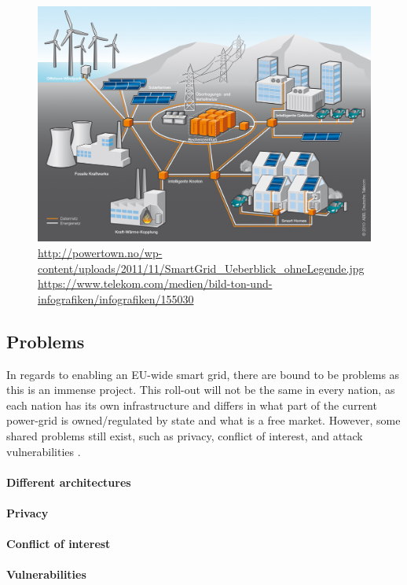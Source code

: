 \begin{figure}
	\includegraphics[width=\textwidth]{figures/SmartGrid_Ueberblick_ohneLegende.jpg}
	\caption{\url{http://powertown.no/wp-content/uploads/2011/11/SmartGrid_Ueberblick_ohneLegende.jpg} \url{https://www.telekom.com/medien/bild-ton-und-infografiken/infografiken/155030}}
	\label{fig:background:smartgrid}
\end{figure}

\subsection{Problems}
In regards to enabling an EU-wide smart grid, there are bound to be problems as this is an immense project.
This roll-out will not be the same in every nation, as each nation has its own infrastructure and differs in what part of the current power-grid is owned/regulated by state and what is a free market.
However, some shared problems still exist, such as privacy, conflict of interest, and attack vulnerabilities \cite{offswitch} \cite{smart_meter_survey}.

\paragraph{Different architectures}

\paragraph{Privacy}

\paragraph{Conflict of interest}

\paragraph{Vulnerabilities}
